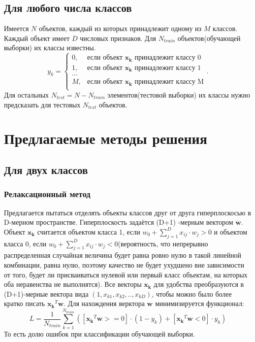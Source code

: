 \documentclass[a4paper]{article}
\newcommand{\w}{\bm{w}}
\newcommand{\yk}{y_k}
\newcommand{\xk}{\bm{x_k}}
\begin{document}
\subsection{Для любого числа классов}

Имеется $N$ объектов, каждый из которых принадлежит одному из $M$ классов. Каждый объект имеет $D$ числовых признаков. Для $N_{train}$ объектов(обучающей выборки) их классы известны. 
$$\yk = \begin{cases}
0, & \text{если объект } \xk \text{ принадлежит классу 0}\\
1, & \text{если объект } \xk \text{ принадлежит классу 1}\\
...\\
M, & \text{если объект } \xk \text{ принадлежит классу M}\\
\end{cases}.
$$
Для остальных $N_{test} = N - N_{train}$ элементов(тестовой выборки) их классы нужно предсказать для тестовых $N_{test}$ объектов.

\section{Предлагаемые методы решения}

\subsection{Для двух классов}

\subsubsection{Релаксационный метод}

Предлагается пытаться отделять объекты классов друг от друга гиперплоскосью в D-мерном пространстве. Гиперплоскость задаётся (D+1) -мерным вектором $\w$. Объект $\xk$ считается объектом класса 1, если $w_{0} + \sum_{j = 1}^{D}x_{ij} \cdot w_j > 0$ и объектом класса 0, если $w_{0} + \sum_{j = 1}^{D}x_{ij} \cdot w_j < 0$(вероятность, что непрерывно распределенная случайная величина будет равна ровно нулю в такой линейной комбинации, равна нулю, поэтому качество не будет ухудшено вне зависимости от того, будет ли присваиваться нулевой или первый класс объектам, на которых оба неравенства не выполнятся). Все векторы $\xk$ для удобства преобразуются в (D+1)-мерные вектора вида $(1, x_{k1}, x_{k2}, .., x_{kD})$, чтобы можно было более кратко писать $\xk^{T}\w$. Для нахождения верктора $\w$ минимизируется функционал:
\begin{equation} \label{01}
L = \frac{1}{N_{train}} \sum_{k = 1}^{N_{train}}([\xk^{T}\w >= 0] \cdot (1 - y_k) + [\xk^{T}\w < 0] \cdot y_k)
\end{equation}
То есть долю ошибок при классификации обучающей выборки.
\end{document}
